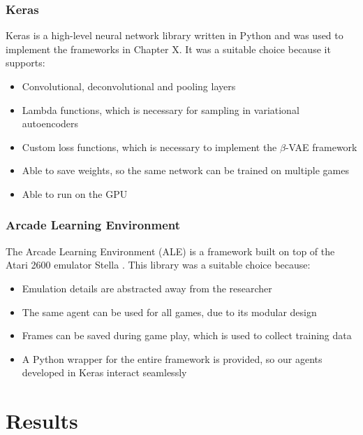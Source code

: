 \documentclass[12pt,twoside]{article}
\begin{document}
\subsubsection{Keras}

Keras is a high-level neural network library written in Python \cite{Chollet2015} and was used to implement the frameworks in Chapter X. It was a suitable choice because it supports:

\begin{itemize}
\item Convolutional, deconvolutional and pooling layers
\item Lambda functions, which is necessary for sampling in variational autoencoders
\item Custom loss functions, which is necessary to implement the $\beta$-VAE framework
\item Able to save weights, so the same network can be trained on multiple games
\item Able to run on the GPU
\end{itemize}

\subsubsection{Arcade Learning Environment}
The Arcade Learning Environment (ALE) is a framework built on top of the Atari 2600 emulator Stella \cite{Bellemare2015}. This library was a suitable choice because:
\begin{itemize}
\item Emulation details are abstracted away from the researcher
\item The same agent can be used for all games, due to its modular design
\item Frames can be saved during game play, which is used to collect training data
\item A Python wrapper for the entire framework is provided, so our agents developed in Keras interact seamlessly
\end{itemize}

\section{Results}
\end{document}
